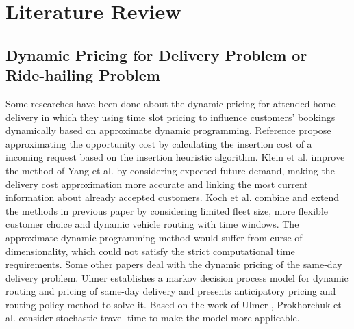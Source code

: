 \documentclass[sigconf,authordraft]{acmart}
\begin{document}
\section{Literature Review}\label{sec:Literature}
\subsection{Dynamic Pricing for Delivery Problem or Ride-hailing Problem}
Some researches have been done about the dynamic pricing for attended home delivery \cite{klein2018model,koch2020route,yang2016choice} in which they using time slot pricing to influence customers' bookings dynamically based on approximate dynamic programming. Reference \cite{yang2016choice} propose approximating the opportunity cost by calculating the insertion cost of a incoming request based on the insertion heuristic algorithm. Klein et al.\cite{klein2018model} improve the method of Yang et al. by considering expected future demand, making the delivery cost approximation more accurate and linking the most current information about already accepted customers. Koch et al. \cite{koch2020route} combine and extend the methods in previous paper by considering limited fleet size, more flexible customer choice and dynamic vehicle routing with time windows. The approximate dynamic programming method would suffer from curse of dimensionality, which could not satisfy the strict computational time requirements. Some other papers deal with the dynamic pricing of the same-day delivery problem. Ulmer \cite{ulmer2020dynamic} establishes a markov decision process model for dynamic routing and pricing of same-day delivery and presents anticipatory pricing and routing policy method to solve it. Based on the work of Ulmer \cite{ulmer2020dynamic}, Prokhorchuk et al. \cite{prokhorchuk2019stochastic} consider stochastic travel time to make the model more applicable. 
\end{document}
